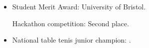 %
\begin{itemize}
    \setlength\itemsep{2em} %
    \iftrue
    \item {}
    \begin{itemize}%
        \iftrue
         Student Merit Award: University of Bristol.
        \fi
        \iftrue
         Hackathon competition: Second place.
        \fi
%
    \end{itemize}%
    \fi
\end{itemize}%
%
\begin{itemize}
    \setlength\itemsep{2em} %
    \iftrue
    \item {}
    \begin{itemize}%
        \iftrue
         National table tenis junior champion: .
        \fi
%
    \end{itemize}%
    \fi
\end{itemize}